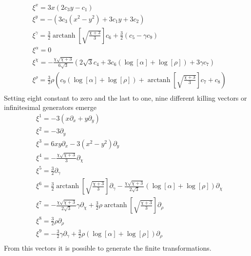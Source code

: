 \begin{equation}
    \begin{aligned}
        &\xi^x = 3x(2c_3 y-c_1) \\
        &\xi^y = -(3c_3(x^2-y^2) + 3c_1y+3c_2)\\
        &\xi^{\gamma} = \frac{3}{2}\operatorname{arctanh}\left[\sqrt{\frac{\chi +3}{3}}\right]c_6 + \frac{3}{2}(c_5-\gamma c_9)\\
        &\xi^{\alpha} =0 \\
        &\xi^{\chi} = -\frac{\chi \sqrt{\chi+3}}{6\sqrt{3}}(2\sqrt{3}c_4+3c_6(\log[\alpha] + \log[\rho]) + 3\gamma c_7)\\
        &\xi^{\rho} = \frac{3}{2}\rho\left(c_9(\log[\alpha]+\log[\rho])+\operatorname{arctanh}\left[\sqrt{\frac{\chi +3}{3}}\right]c_7 + c_8 \right)\\
        \label{contravariant_components}
    \end{aligned}
\end{equation}
Setting eight constant to zero and the last to one, nine different killing vectors or infinitesimal generators emerge 
\begin{equation}
    \begin{aligned}
        &\xi^{1} = -3(x\partial_x +y\partial_y)\\
        &\xi^{2} = -3\partial_y \\
        &\xi^{3} = 6xy\partial_x -3(x^2-y^2)\partial_y \\
        &\xi^{4} = -\frac{\chi\sqrt{\chi+3}}{3}\partial_{\chi}\\
        &\xi^{5} = \frac{3}{2}\partial_{\gamma}\\
        &\xi^{6} = \frac{3}{2}\operatorname{arctanh}\left[ \sqrt{\frac{\chi +3}{3}}\right]\partial_{\gamma} -\frac{\chi \sqrt{\chi+3}}{2\sqrt{3}}(\log[\alpha]+ \log[\rho])\partial_{\chi}\\
        &\xi^{7} = -\frac{\chi\sqrt{\chi+3}}{2\sqrt{3}}\gamma\partial_{\chi} +\frac{3}{2}\rho\operatorname{arctanh}\left[ \sqrt{\frac{\chi +3}{3}}\right]\partial_{\rho}\\
        &\xi^{8} = \frac{3}{2}\rho\partial_{\rho}\\
        &\xi^{9} = -\frac{3}{2}\gamma\partial_{\gamma} +\frac{3}{2}\rho(\log[\alpha]+\log[\rho])\partial_{\rho}\\
    \end{aligned}
    \label{killing vectors scarichi}
\end{equation}
From this vectors it is possible to generate the finite transformations.

